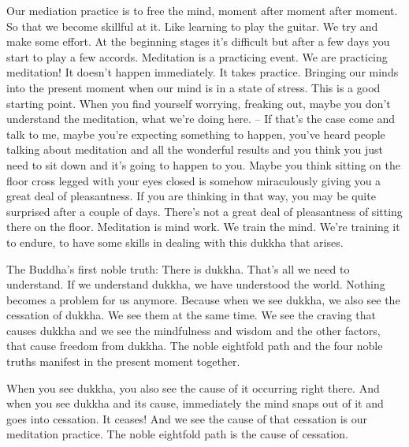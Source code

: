 \documentclass[letterpaper,10pt,english]{sphinxmanual}
\begin{document}
\sphinxAtStartPar
Our mediation practice is to free the mind, moment after moment after
moment. So that we become skillful at it. Like learning to play the guitar. We
try and make some effort. At the beginning stages it’s difficult but after a few
days you start to play a few accords. Meditation is a practicing event. We
are practicing meditation! It doesn’t happen immediately. It takes practice.
Bringing our minds into the present moment when our mind is in a state of
stress. This is a good starting point. When you find yourself worrying, freaking out, maybe you don’t understand the meditation, what we’re doing here.
– If that’s the case come and talk to me, maybe you’re expecting something
to happen, you’ve heard people talking about meditation and all the wonderful results and you think you just need to sit down and it’s going to happen to
you. Maybe you think sitting on the floor cross legged with your eyes closed
is  somehow  miraculously  giving  you  a  great  deal  of  pleasantness.  If  you
are thinking in that way, you may be quite surprised after a couple of days.
There’s not a great deal of pleasantness of sitting there on the floor. Meditation   is mind work. We train the mind. We’re training it to endure, to have
some skills in dealing with this dukkha that arises.

\sphinxAtStartPar
The Buddha’s first noble truth: There is dukkha. That’s all we need to
understand. If we understand dukkha, we have understood the world. Nothing becomes a problem for us anymore. Because when we see dukkha, we
also see the cessation of dukkha. We see them at the same time. We see the
craving that causes dukkha and we see the mindfulness and wisdom and the
other factors, that cause freedom from dukkha. The noble eightfold path and
the four noble truths manifest in the present moment together.

\sphinxAtStartPar
When  you  see  dukkha,  you  also  see  the  cause  of  it  occurring  right
there. And when you see dukkha and its cause, immediately the mind snaps
out of it and goes into cessation. It ceases! And we see the cause of that cessation  is  our  meditation  practice. The  noble  eightfold  path  is  the  cause  of
cessation.
\end{document}
